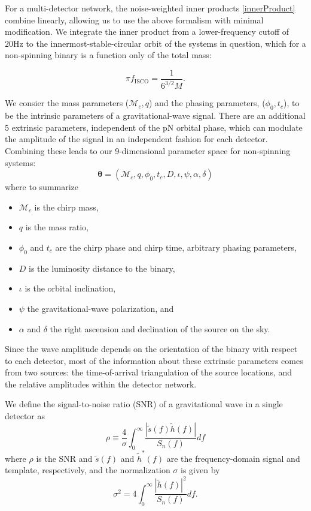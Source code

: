 \documentclass[11pt,a4paper]{emulateapj}
\newcommand{\thpara}{\boldsymbol{\theta}}
\newcommand{\chmass}{\mathcal{M}_c}
\begin{document}
For a multi-detector network, the noise-weighted inner products
\eqref{innerProduct} combine linearly, allowing us to use the above
formalism with minimal modification.  We integrate the inner product
from a lower-frequency cutoff of $20\text{Hz}$ to the
innermost-stable-circular orbit of the systems in question, which for a
non-spinning binary is a function only of the total mass:

\begin{equation}
  \pi f_{\text{ISCO}} = \frac{1}{6^{3/2}M}.
  \label{ISCOFrequency}
\end{equation}
   
We consier the mass parameters ($\chmass,q$) and the phasing parameters,
($\phi_0,t_c$), to be the intrinsic parameters of a gravitational-wave signal.  There 
are an additional 5 extrinsic parameters, independent of the pN orbital phase, which can
modulate the amplitude of the signal in an independent fashion for each detector.  
Combining these leads to our 9-dimensional parameter space for non-spinning systems:
\begin{equation}
\thpara =  (\chmass, q, \phi_0,t_c,D,\iota,\psi,\alpha,\delta)
\label{parameterspace}
\end{equation}
where to summarize

\begin{itemize}
\item $\chmass$ is the chirp mass,
\item $q$ is the mass ratio,
\item $\phi_0$ and $t_c$ are the chirp phase and chirp time, arbitrary phasing parameters,
\item $D$ is the luminosity distance to the binary,
\item $\iota$ is the orbital inclination, 
\item $\psi$ the gravitational-wave polarization, and
\item $\alpha$ and $\delta$ the right ascension and declination of the
source on the sky.
\end{itemize}
  Since the wave amplitude depends on the orientation of the
binary with respect to each detector, most of the information about these extrinsic
parameters comes from two sources: the time-of-arrival triangulation of 
the source locations, and the relative amplitudes within the detector network.

We define the signal-to-noise ratio (SNR) of a gravitational wave in a
single detector as 
\begin{equation}
  \rho \equiv \frac{4}{\sigma} \int^{\infty}_{0}\frac{| \tilde{s}(f)\tilde{h}(f)|}{S_{n}(f)}df
  \label{formalSNR}
\end{equation}
where $\rho$ is the SNR and $\tilde s(f)$ and $\tilde{h}^{*}(f)$ are
the frequency-domain signal and template, respectively, and the normalization $\sigma$ is
given by
\begin{equation}
  \sigma^2 = 4\int^{\infty}_{0}\frac{| \tilde{h}(f)|^2}{S_n(f)}df.
  \label{SNRnorm}
\end{equation}
\end{document}
